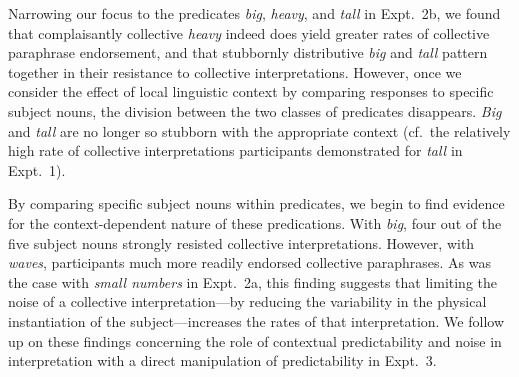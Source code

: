 \documentclass[linguex]{sp}
\begin{document}
Narrowing our focus to the predicates \emph{big}, \emph{heavy}, and \emph{tall} in Expt.~2b, we found that complaisantly collective \emph{heavy} indeed does yield greater rates of collective paraphrase endorsement, and that stubbornly distributive \emph{big} and \emph{tall} pattern together in their resistance to collective interpretations. However, once we consider the effect of local linguistic context by comparing responses to specific subject nouns, the division between the two classes of predicates disappears. \emph{Big} and \emph{tall} are no longer so stubborn with the appropriate context (cf.~the relatively high rate of collective interpretations participants demonstrated for \emph{tall} in Expt.~1).



By comparing specific subject nouns within predicates, we begin to find evidence for the context-dependent nature of these predications. With \emph{big}, four out of the five subject nouns strongly resisted collective interpretations. However, with \emph{waves}, participants much more readily endorsed collective paraphrases. As was the case with \emph{small numbers} in Expt.~2a, this finding suggests that limiting the noise of a collective interpretation---by reducing the variability in the physical instantiation of the subject---increases the rates of that interpretation. We follow up on these findings concerning the role of contextual predictability and noise in interpretation with a direct manipulation of predictability in Expt.~3.
\end{document}
